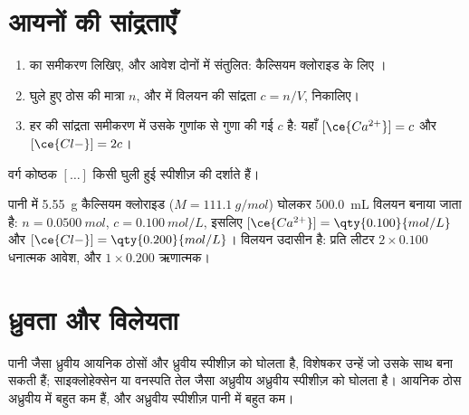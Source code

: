 \section{आयनों की सांद्रताएँ}

\begin{method}[हर आयन की सांद्रता]\label{met:g11:dissolution:ions}
\begin{enumerate}
  \item {} का समीकरण लिखिए,  और आवेश दोनों में संतुलित:
        कैल्सियम क्लोराइड के लिए ।
  \item घुले हुए ठोस की मात्रा $n$, और  में विलयन की सांद्रता
        $c = n / V$, निकालिए।
  \item हर  की सांद्रता समीकरण में उसके गुणांक से गुणा की गई $c$ है:
        यहाँ $[\ce{Ca^{2+}}] = c$ और
        $[\ce{Cl-}] = 2c$।
\end{enumerate}
वर्ग कोष्ठक $[\ldots]$ किसी घुली हुई स्पीशीज़ की 
दर्शाते हैं।
\end{method}

\begin{example}[कैल्सियम क्लोराइड]\label{ex:g11:dissolution:cacl2}
पानी में \qty{5.55}{g} कैल्सियम क्लोराइड ($M = \qty{111.1}{g/mol}$) घोलकर
\qty{500.0}{mL} विलयन बनाया जाता है: $n = \qty{0.0500}{mol}$,
$c = \qty{0.100}{mol/L}$, इसलिए $[\ce{Ca^{2+}}] = \qty{0.100}{mol/L}$ और
$[\ce{Cl-}] = \qty{0.200}{mol/L}$। विलयन उदासीन है: प्रति लीटर $2 \times
0.100$ धनात्मक आवेश, और $1 \times 0.200$ ऋणात्मक।
\end{example}

\section{ध्रुवता और विलेयता}

\begin{proposition}[समान, समान को घोलता है]\label{prop:g11:dissolution:like}
पानी जैसा ध्रुवीय  आयनिक ठोसों और ध्रुवीय
स्पीशीज़ को घोलता है, विशेषकर उन्हें जो उसके साथ  बना सकती हैं;
साइक्लोहेक्सेन या वनस्पति तेल जैसा अध्रुवीय  अध्रुवीय स्पीशीज़ को
घोलता है। आयनिक ठोस अध्रुवीय  में बहुत कम  हैं, और
अध्रुवीय स्पीशीज़ पानी में बहुत कम।
\end{proposition}

